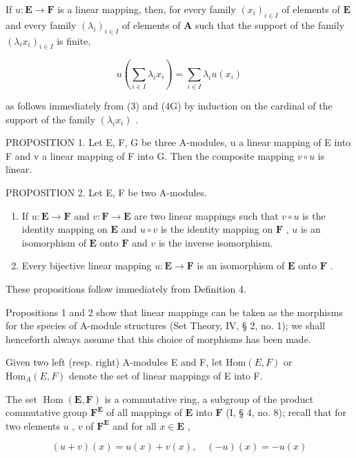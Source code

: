 If \(u: \mathbf{E} \to \mathbf{F}\) is a linear mapping, then, for every family \((x_{i})_{i \in I}\) of elements of \(\mathbf{E}\) and every family \((\lambda_{i})_{i \in I}\) of elements of \(\mathbf{A}\) such that the support of the family \((\lambda_{i}x_{i})_{i \in I}\) is finite,

\[
u \left(\sum_ {i \in I} \lambda_ {i} x _ {i}\right) = \sum_ {i \in I} \lambda_ {i} u (x _ {i})\tag{5}
\]

as follows immediately from (3) and (4G) by induction on the cardinal of the support of the family \((\lambda_{i}x_{i})\) .

PROPOSITION 1. Let E, F, G be three A-modules, u a linear mapping of E into F and v a linear mapping of F into G. Then the composite mapping \(v \circ u\) is linear.

PROPOSITION 2. Let E, F be two A-modules.

\begin{enumerate}
\def\labelenumi{(\arabic{enumi})}
\item
  If \(u: \mathbf{E} \to \mathbf{F}\) and \(v: \mathbf{F} \to \mathbf{E}\) are two linear mappings such that \(v \circ u\) is the identity mapping on \(\mathbf{E}\) and \(u \circ v\) is the identity mapping on \(\mathbf{F}\) , \(u\) is an isomorphism of \(\mathbf{E}\) onto \(\mathbf{F}\) and \(v\) is the inverse isomorphism.
\item
  Every bijective linear mapping \(u: \mathbf{E} \to \mathbf{F}\) is an isomorphism of \(\mathbf{E}\) onto \(\mathbf{F}\) .
\end{enumerate}

These propositions follow immediately from Definition 4.

Propositions 1 and 2 show that linear mappings can be taken as the morphisms for the species of A-module structures (Set Theory, IV, § 2, no. 1); we shall henceforth always assume that this choice of morphisms has been made.

Given two left (resp. right) A-modules E and F, let \(\text{Hom}(E, F)\) or \(\text{Hom}_{A}(E, F)\) denote the set of linear mappings of E into F.

The set \(\operatorname{Hom}(\mathbf{E},\mathbf{F})\) is a commutative ring, a subgroup of the product commutative group \(\mathbf{F}^{\mathbf{E}}\) of all mappings of \(\mathbf{E}\) into \(\mathbf{F}\) (I, § 4, no. 8); recall that for two elements \(u\) , \(v\) of \(\mathbf{F}^{\mathbf{E}}\) and for all \(x\in\mathbf{E}\) ,

\[
(u + v) (x) = u (x) + v (x), \quad (- u) (x) = - u (x)
\]

